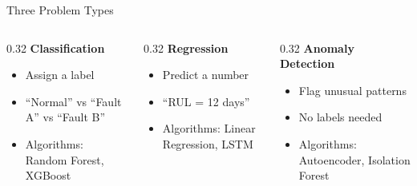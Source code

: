 \documentclass[aspectratio=169,11pt]{beamer}
\begin{document}
\begin{frame}{Three Problem Types}
    \begin{columns}[T]
        \begin{column}{0.32\textwidth}
            \textbf{Classification}
            \begin{itemize}
                \item Assign a label
                \item ``Normal'' vs ``Fault A'' vs ``Fault B''
                \item Algorithms: Random Forest, XGBoost
            \end{itemize}
        \end{column}
        \begin{column}{0.32\textwidth}
            \textbf{Regression}
            \begin{itemize}
                \item Predict a number
                \item ``RUL = 12 days''
                \item Algorithms: Linear Regression, LSTM
            \end{itemize}
        \end{column}
        \begin{column}{0.32\textwidth}
            \textbf{Anomaly Detection}
            \begin{itemize}
                \item Flag unusual patterns
                \item No labels needed
                \item Algorithms: Autoencoder, Isolation Forest
            \end{itemize}
        \end{column}
    \end{columns}
\end{frame}
\end{document}
